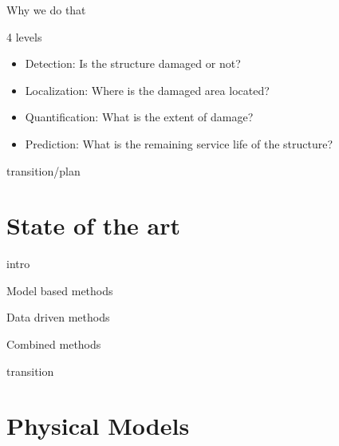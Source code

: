 \documentclass{beamer}
\begin{document}
\begin{frame}{Why we do that}
\end{frame}


\begin{frame}{4 levels}
\begin{center}
\begin{itemize}
\item Detection: Is the structure damaged or not?
\item Localization: Where is the damaged area located?
\item Quantification: What is the extent of damage?
\item Prediction: What is the remaining service life of the structure?
\end{itemize}
\end{center}
\end{frame}


\begin{frame}{transition/plan}
\end{frame}


\section{State of the art}


\begin{frame}{intro}
\end{frame}


\begin{frame}{Model based methods}
\end{frame}


\begin{frame}{Data driven methods}
\end{frame}


\begin{frame}{Combined methods}
\end{frame}


\begin{frame}{transition}
\end{frame}


\section{Physical Models}
\end{document}
